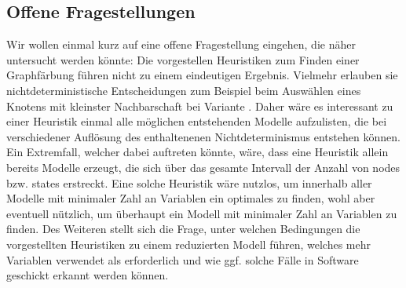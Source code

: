 \documentclass[a4paper]{article}
\theoremstyle{nonumberplain}
\begin{document}
\subsection{Offene Fragestellungen}

Wir wollen einmal kurz auf eine offene Fragestellung eingehen, die näher untersucht werden könnte:
Die vorgestellen Heuristiken zum Finden einer Graph\-färbung führen nicht zu einem eindeutigen Ergebnis.
Vielmehr erlauben sie nichtdeterministische Entscheidungen zum Beispiel beim Auswählen eines Knotens mit kleinster Nachbarschaft bei Variante .
Daher wäre es interessant zu einer Heuristik einmal alle möglichen entstehenden Modelle aufzulisten, die bei verschiedener Auflösung des enthaltenenen Nichtdeterminismus entstehen können.
Ein Extremfall, welcher dabei auftreten könnte, wäre, dass eine Heuristik allein bereits Modelle erzeugt, die sich über das gesamte Intervall der Anzahl von nodes bzw. states erstreckt.
Eine solche Heuristik wäre nutzlos, um innerhalb aller Modelle mit minimaler Zahl an Variablen ein optimales zu finden, wohl aber eventuell nützlich, um überhaupt ein Modell mit minimaler Zahl an Variablen zu finden.
Des Weiteren stellt sich die Frage, unter welchen Bedingungen die vorgestellten Heuristiken zu einem reduzierten Modell führen, welches mehr Variablen verwendet als erforderlich und wie ggf. solche Fälle in Software geschickt erkannt werden können.


\printbibliography
\end{document}
